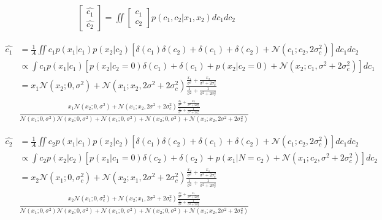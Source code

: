 \documentclass[12pt]{article}
\begin{document}
\begin{equation}
\begin{aligned}
\left[\begin{array}{c}
\hat{c_1}\\ \hat{c_2}
\end{array}\right]
= \iint \left[\begin{array}{c}
c_1\\ c_2
\end{array}\right]
p(c_1, c_2|x_1, x_2) dc_1dc_2
\end{aligned}
\end{equation}

\begin{equation}
\begin{aligned}
\hat{c_1} & = \frac{1}{A} \iint c_1 p(x_1|c_1) p(x_2|c_2)[\delta(c_1)\delta(c_2) + \delta(c_1) +  \delta(c_2) + \mathcal{N}(c_1; c_2, 2\sigma_c^2)] dc_1dc_2 \\
& \propto \int c_1 p(x_1|c_1) [p(x_2|c_2=0)\delta(c_1) + \delta(c_1) + p(x_2|c_2=0) + \mathcal{N}(x_2; c_1, \sigma^2 + 2\sigma_c^2)]dc_1 \\
& = x_1\mathcal{N}(x_2; 0, \sigma^2) + \mathcal{N}(x_1; x_2, 2\sigma^2 + 2\sigma_c^2) \frac{\frac{x_1}{\sigma^2} + \frac{x_2}{\sigma^2 + 2\sigma_c^2}}{\frac{1}{\sigma^2} + \frac{1}{\sigma^2 + 2\sigma_c^2}} \\
& \frac{x_1\mathcal{N}(x_2; 0, \sigma^2) + \mathcal{N}(x_1; x_2, 2\sigma^2 + 2\sigma_c^2) \frac{\frac{x_1}{\sigma^2} + \frac{x_2}{\sigma^2 + 2\sigma_c^2}}{\frac{1}{\sigma^2} + \frac{1}{\sigma^2 + 2\sigma_c^2}}}{\mathcal{N}(x_1; 0, \sigma^2)\mathcal{N}(x_2; 0, \sigma^2) + \mathcal{N}(x_1; 0, \sigma^2) +\mathcal{N}(x_2; 0, \sigma^2) + \mathcal{N}(x_1; x_2, 2\sigma^2 + 2\sigma_c^2)}
\end{aligned}
\end{equation}

\begin{equation}
\begin{aligned}
\hat{c_2} & = \frac{1}{A} \iint c_2 p(x_1|c_1) p(x_2|c_2)[\delta(c_1)\delta(c_2) + \delta(c_1) +  \delta(c_2) + \mathcal{N}(c_1; c_2, 2\sigma_c^2)] dc_1dc_2 \\
& \propto \int c_2 p(x_2|c_2) [p(x_1|c_1=0)\delta(c_2) + \delta(c_2) + p(x_1|N=c_2) + \mathcal{N}(x_1; c_2, \sigma^2 + 2\sigma_c^2)]dc_2 \\
& = x_2\mathcal{N}(x_1; 0, \sigma_c^2) + \mathcal{N}(x_2; x_1, 2\sigma^2 + 2\sigma_c^2) \frac{\frac{x_2}{\sigma^2} + \frac{x_1}{\sigma^2 + 2\sigma_c^2}}{\frac{1}{\sigma^2} + \frac{1}{\sigma^2 + 2\sigma_c^2}}\\
& \frac{x_2\mathcal{N}(x_1; 0, \sigma_c^2) + \mathcal{N}(x_2; x_1, 2\sigma^2 + 2\sigma_c^2) \frac{\frac{x_2}{\sigma^2} + \frac{x_1}{\sigma^2 + 2\sigma_c^2}}{\frac{1}{\sigma^2} + \frac{1}{\sigma^2 + 2\sigma_c^2}}}{\mathcal{N}(x_1; 0, \sigma^2)\mathcal{N}(x_2; 0, \sigma^2) + \mathcal{N}(x_1; 0, \sigma^2) +\mathcal{N}(x_2; 0, \sigma^2) + \mathcal{N}(x_1; x_2, 2\sigma^2 + 2\sigma_c^2)}
\end{aligned}
\end{equation}
\end{document}
